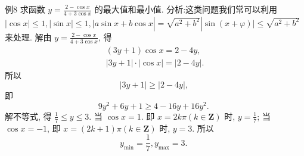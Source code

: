 例8 求函数 $y=\frac{2-\cos x}{4+3 \cos x}$ 的最大值和最小值.
分析:这类问题我们常可以利用 $|\cos x| \leqslant 1,|\sin x| \leqslant 1, \mid a \sin x+ b \cos x\left|=\sqrt{a^2+b^2}\right| \sin (x+\varphi) \mid \leqslant \sqrt{a^2+b^2}$ 来处理.
解由 $y=\frac{2-\cos x}{4+3 \cos x}$, 得
$$
\begin{gathered}
(3 y+1) \cos x=2-4 y, \\
|3 y+1| \cdot|\cos x|=|2-4 y| .
\end{gathered}
$$
所以
$$
|3 y+1| \geqslant|2-4 y| \text {, }
$$
即
$$
9 y^2+6 y+1 \geqslant 4-16 y+16 y^2 \text {. }
$$
解不等式, 得 $\frac{1}{7} \leqslant y \leqslant 3$.
当 $\cos x=1$. 即 $x=2 k \pi(k \in \mathbf{Z})$ 时, $y=\frac{1}{7}$;
当 $\cos x=-1$, 即 $x=(2 k+1) \pi(k \in \mathbf{Z})$ 时, $y=3$.
所以
$$
y_{\min }=\frac{1}{7}, y_{\max }=3 \text {. }
$$



